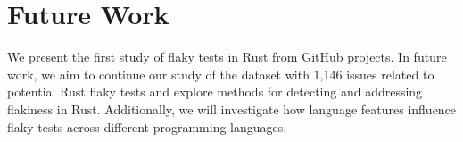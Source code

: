 \section{Future Work}
\label{sec:futurework}
We present the first study of flaky tests in Rust from GitHub projects. In future work, we aim to continue our study of the dataset with 1,146 issues related to potential Rust flaky tests and explore methods for detecting and addressing flakiness in Rust. Additionally, we will investigate how language features influence flaky tests across different programming languages.